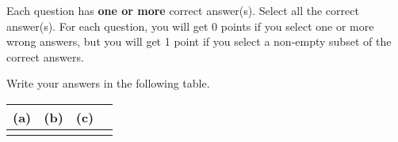 
Each question has \textbf{one or more} correct answer(s). Select all the correct answer(s). For each question, you will get 0 points if you select one or more wrong answers, but you will get 1 point if you select a non-empty subset of the correct answers.

Write your answers in the following table.

\begin{table}[htbp]
    \centering
    \begin{tabular}{|p{2cm}|p{2cm}|p{2cm}|p{2cm}|}
        \hline
        (a) & (b) & (c) \\
        \hline
            &     &     \\
        \hline
    \end{tabular}
\end{table}

